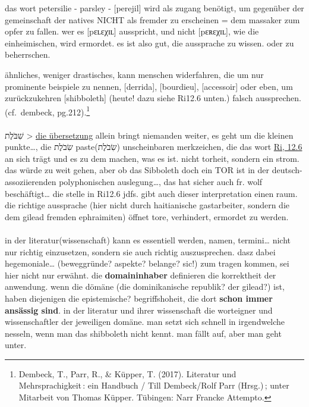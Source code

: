 \documentclass[
  letterpaper,
  DIV=11,
  numbers=noendperiod]{scrartcl}
\makeatletter
\let\oldparagraph\paragraph
\renewcommand{\paragraph}{
    \@ifstar
      \xxxParagraphStar
      \xxxParagraphNoStar
  }
\newcommand{\xxxParagraphStar}[1]{\oldparagraph*{#1}\mbox{}}
\newcommand{\xxxParagraphNoStar}[1]{\oldparagraph{#1}\mbox{}}
\makeatother
\begin{document}
das wort petersilie - parsley - {[}perejil{]} wird als zugang benötigt,
um gegenüber der gemeinschaft der natives NICHT als fremder zu
erscheinen = dem massaker zum opfer zu fallen. wer es
{[}p{\ipafont ɛʟɛ}χ{\ipafont ɪʟ}{]} ausspricht, und nicht
{[}p{\ipafont ɛʀɛ}χ{\ipafont ɪʟ}{]}, wie die einheimischen, wird
ermordet. es ist also gut, die aussprache zu wissen. oder zu
beherrschen.

ähnliches, weniger drastisches, kann menschen widerfahren, die um nur
prominente beispiele zu nennen, {[}derrida{]}, {[}bourdieu{]},
{[}accessoir{]} oder eben, um zurückzukehren {[}shibboleth{]} (heute!
dazu siehe Ri12.6 unten.) falsch aussprechen. (cf.~dembeck,
pg.212).\footnote{Dembeck, T., Parr, R., \& Küpper, T. (2017). Literatur
  und Mehrsprachigkeit\,: ein Handbuch / Till Dembeck/Rolf Parr
  (Hrsg.)\,; unter Mitarbeit von Thomas Küpper. Tübingen: Narr Francke
  Attempto.}

\paragraph{}\label{section-1}

שִׁבֹּלֶת \textgreater{}
\href{https://www.pealim.com/dict/3270-shibolet/}{die übersetzung}
allein bringt niemanden weiter, es geht um die kleinen punkte\ldots, die
שִׂבֹלֶת paste(שִׂבֹלֶת) unscheinbaren merkzeichen, die das wort
\href{https://www.sefaria.org/Judges.12.6?lang=bi&with=all&lang2=en}{Ri,
12.6} an sich trägt und es zu dem machen, was es ist. nicht torheit,
sondern ein strom. das würde zu weit gehen, aber ob das Sibboleth doch
ein TOR ist in der deutsch-assoziierenden polyphonischen
auslegung\ldots, das hat sicher auch fr. wolf beschäftigt\ldots{} die
stelle in Ri12.6 jdfs. gibt auch dieser interpretation einen raum. die
richtige aussprache (hier nicht durch haitianische gastarbeiter, sondern
die dem gilead fremden ephraimiten) öffnet tore, verhindert, ermordet zu
werden.

\paragraph{}\label{section-2}

in der literatur(wissenschaft) kann es essentiell werden, namen,
termini\ldots{} nicht nur richtig einzusetzen, sondern sie auch richtig
auszusprechen. dasz dabei hegemoniale\ldots{} (beweggründe? aspekte?
belange? sic!) zum tragen kommen, sei hier nicht nur erwähnt. die
\textbf{domaininhaber} definieren die korrektheit der anwendung. wenn
die dömäne (die dominikanische republik? der gilead?) ist, haben
diejenigen die epistemische? begriffshoheit, die dort \textbf{schon
immer ansässig sind}. in der literatur und ihrer wissenschaft die
worteigner und wissenschaftler der jeweiligen domäne. man setzt sich
schnell in irgendwelche nesseln, wenn man das shibboleth nicht kennt.
man fällt auf, aber man geht unter.
\end{document}
